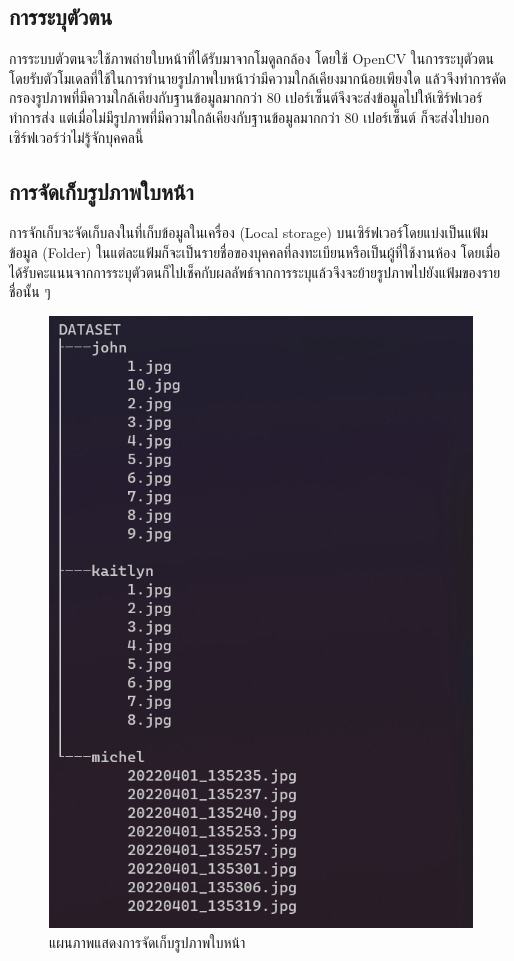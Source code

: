\subsection{การระบุตัวตน}
การระบบตัวตนจะใช้ภาพถ่ายใบหน้าที่ได้รับมาจากโมดูลกล้อง โดยใช้ OpenCV ในการระบุตัวตนโดยรับตัวโมเดลที่ใช้ในการทำนายรูปภาพใบหน้าว่ามีความใกล้เคียงมากน้อยเพียงใด
แล้วจึงทำการคัดกรองรูปภาพที่มีความใกล้เคียงกับฐานข้อมูลมากกว่า 80 เปอร์เซ็นต์จึงจะส่งข้อมูลไปให้เซิร์ฟเวอร์ทำการส่ง 
แต่เมื่อไม่มีรูปภาพที่มีความใกล้เคียงกับฐานข้อมูลมากกว่า 80 เปอร์เซ็นต์ ก็จะส่งไปบอกเซิร์ฟเวอร์ว่าไม่รู้จักบุคคลนี้

\subsection{การจัดเก็บรูปภาพใบหน้า}
การจักเก็บจะจัดเก็บลงในที่เก็บข้อมูลในเครื่อง (Local storage) บนเซิร์ฟเวอร์โดยแบ่งเป็นแฟ้มข้อมูล (Folder) 
ในแต่ละแฟ้มก็จะเป็นรายชื่อของบุคคลที่ลงทะเบียนหรือเป็นผู้ที่ใช้งานห้อง 
โดยเมื่อได้รับคะแนนจากการระบุตัวตนก็ไปเช็คกับผลลัพธ์จากการระบุแล้วจึงจะย้ายรูปภาพไปยังแฟ้มของรายชื่อนั้น ๆ

\begin{figure}[h]
  \begin{center}
    \includegraphics[scale=.5]{pic/dataset.png}
  \caption[Poem]{แผนภาพแสดงการจัดเก็บรูปภาพใบหน้า}
  \end{center}
  \label{fig:folder}
\end{figure}
\newpage

